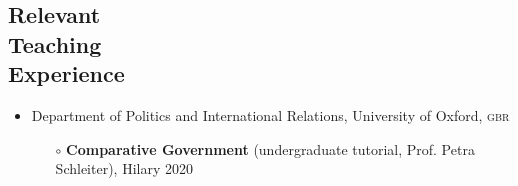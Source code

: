 \documentclass[letterpaper,margin]{res}
\begin{document}
\begin{resume}

\section{\footnotesize Relevant \\ Teaching \\ Experience} %

\begin{itemize}
\item{\small Department of Politics and International Relations, University of Oxford, {\scshape gbr}}
\begin{itemize}
\item[$\circ$]{\small {\bf Comparative Government} (undergraduate tutorial, Prof. Petra Schleiter), Hilary 2020}
\end{itemize}
\end{itemize}


\end{resume}
\end{document}
